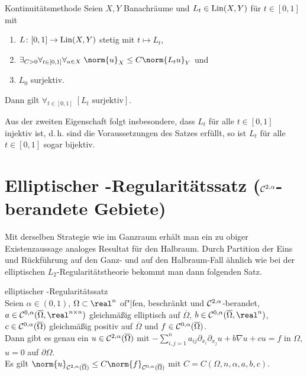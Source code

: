 \begin{Satz}{Kontinuitätsmethode}
    Seien $X, Y$ Banachräume und $L_t \in \operatorname{Lin}(X, Y)$ für $t \in [0, 1]$ mit
    \begin{enumerate}
        \item
        $L\colon [0,1] \rightarrow \operatorname{Lin}(X, Y)$ stetig mit $t \mapsto L_t$,

        \item
        $\exists_{C > 0} \forall_{t \in [0, 1]} \forall_{u \in X}\;
        \norm{u}_X \le C \norm{L_t u}_Y$ und

        \item
        $L_0$ surjektiv.
    \end{enumerate}
    Dann gilt $\forall_{t \in [0, 1]}\; [\text{$L_t$ surjektiv}]$.
\end{Satz}

\begin{Bem}
    Aus der zweiten Eigenschaft folgt insbesondere, dass $L_t$ für alle $t \in [0, 1]$ injektiv
    ist, d.\,h. sind die Voraussetzungen des Satzes erfüllt, so ist
    $L_t$ für alle $t \in [0, 1]$ sogar bijektiv.
\end{Bem}

\section{%
    Elliptischer -Regularitätssatz
    (\texorpdfstring{$\mathcal{C}^{2,\alpha}$}{C² ᵅ}-berandete Gebiete)%
}

\begin{Bem}
    Mit derselben Strategie wie im Ganzraum erhält man ein zu obiger Existenzaussage
    analoges Resultat für den Halbraum.
    Durch Partition der Eins und Rückführung auf den Ganz- und auf den Halbraum-Fall ähnlich wie
    bei der elliptischen $L_2$-Regularitätstheorie bekommt man dann folgenden Satz.
\end{Bem}

\begin{Satz}{elliptischer -Regularitätssatz}\\
    Seien $\alpha \in (0, 1)$,
    $\Omega \subset \real^n$ of"|fen, beschränkt und $\mathcal{C}^{2,\alpha}$-berandet,
    $a \in \C^{0,\alpha}(\overline{\Omega}, \real^{n \times n})$
    gleichmäßig elliptisch auf $\overline{\Omega}$,
    $b \in \C^{0,\alpha}(\overline{\Omega}, \real^n)$,
    $c \in \mathcal{C}^{0,\alpha}(\overline{\Omega})$ gleichmäßig positiv auf $\overline{\Omega}$ und
    $f \in \mathcal{C}^{0,\alpha}(\overline{\Omega})$.\\
    Dann gibt es genau ein $u \in \mathcal{C}^{2,\alpha}(\overline{\Omega})$ mit
    $-\sum_{i,j=1}^n a_{ij} \partial_{x_i} \partial_{x_j} u + b \nabla u + cu = f$ in $\Omega$,
    $u = 0$ auf $\partial\Omega$.\\
    Es gilt
    $\norm{u}_{\C^{2,\alpha}(\overline{\Omega})} \le C \norm{f}_{\C^{0,\alpha}(\overline{\Omega})}$
    mit $C = C(\Omega, n, \alpha, a, b, c)$.
\end{Satz}

